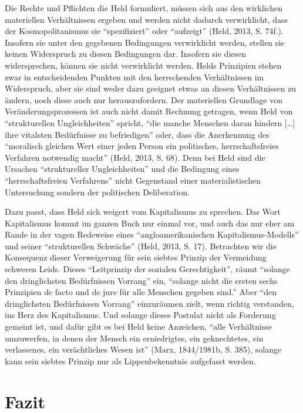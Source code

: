 \documentclass[ngerman,12pt, titlepage, smallheadings, nomath]{scrartcl}
\begin{document}
Die Rechte und Pflichten die Held formuliert, müssen sich aus den
wirklichen materiellen Verhältnissen ergeben und werden nicht dadurch
verwirklicht, dass der Kosmopolitanismus sie \enquote{spezifiziert} oder
\enquote{aufzeigt} (Held, 2013, S. 74f.). Insofern sie unter den
gegebenen Bedingungen verwirklicht werden, stellen sie keinen
Widerspruch zu diesen Bedingungen dar. Insofern sie diesen
widersprechen, können sie nicht verwirklicht werden. Helds Prinzipien
stehen zwar in entscheidenden Punkten mit den herrschenden Verhältnissen
im Widerspruch, aber sie sind weder dazu geeignet etwas an diesen
Verhältnissen zu ändern, noch diese auch nur herauszufordern. Der
materiellen Grundlage von Veränderungsprozessen ist auch nicht damit
Rechnung getragen, wenn Held von \enquote{strukturellen Ungleichheiten}
spricht, \enquote{die manche Menschen daran hindern {[}\ldots{}{]} ihre
vitalsten Bedürfnisse zu befriedigen} oder, dass die Anerkennung des
\enquote{moralisch gleichen Wert einer jeden Person ein politisches,
herrschaftsfreies Verfahren notwendig macht} (Held, 2013, S. 68). Denn
bei Held sind die Ursachen \enquote{struktureller Ungleichheiten} und
die Bedingung eines \enquote{herrschaftsfreien Verfahrens} nicht
Gegenstand einer materialistischen Untersuchung sondern der politischen
Deliberation.

Dazu passt, dass Held sich weigert vom Kapitalismus zu sprechen. Das
Wort Kapitalismus kommt im ganzen Buch nur einmal vor, und auch das nur
eher am Rande in der vagen Redeweise eines \enquote{angloamerikanischen
Kapitalismus-Modells} und seiner \enquote{strukturellen Schwäche} (Held,
2013, S. 17). Betrachten wir die Konsequenz dieser Verweigerung für sein
siebtes Prinzip der Vermeidung schweren Leids. Dieses
\enquote{Leitprinzip der sozialen Gerechtigkeit}, räumt \enquote{solange
den dringlichsten Bedürfnissen Vorrang} ein, \enquote{solange nicht die
ersten sechs Prinzipien de facto und de jure für alle Menschen gegeben
sind.} Aber \enquote{den dringlichsten Bedürfnissen Vorrang} einzuräumen
zielt, wenn richtig verstanden, ins Herz des Kapitalismus. Und solange
dieses Postulat nicht als Forderung gemeint ist, und dafür gibt es bei
Held keine Anzeichen, \enquote{alle Verhältnisse umzuwerfen, in denen
der Mensch ein erniedrigtes, ein geknechtetes, ein verlassenes, ein
verächtliches Wesen ist} (Marx, 1844/1981b, S. 385), solange kann sein
siebtes Prinzip nur als Lippenbekenntnis aufgefasst werden.

\section{Fazit}\label{fazit}
\end{document}

